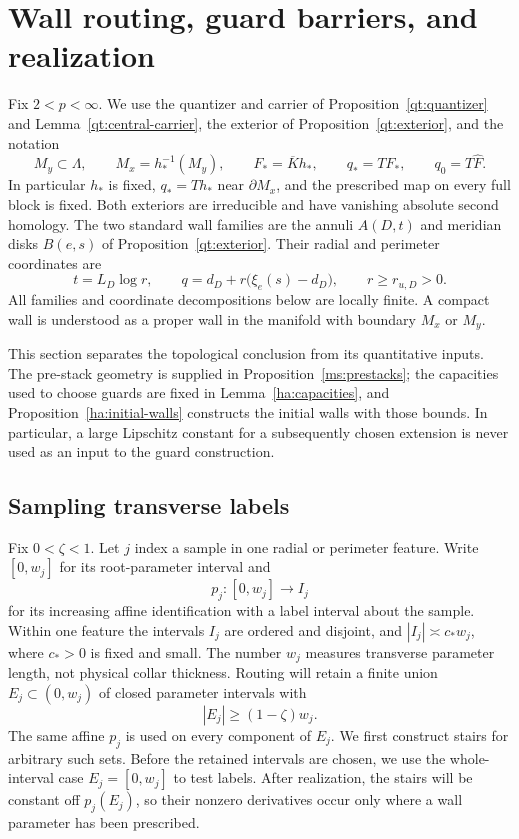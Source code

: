 \section{Wall routing, guard barriers, and realization}\label{sec:walls}\label{wl:section}

Fix $2<p<\infty$.  We use the quantizer and carrier of
Proposition~\ref{qt:quantizer} and Lemma~\ref{qt:central-carrier}, the exterior
of Proposition~\ref{qt:exterior}, and the notation
\[
 M_y\subset\Lambda,\qquad M_x=h_*^{-1}(M_y),\qquad
 F_*=\overline K h_*,\qquad q_*=TF_*,\qquad q_0=T\widehat F.
\]
In particular $h_*$ is fixed, $q_*=Th_*$ near $\partial M_x$, and the
prescribed map on every full block is fixed.  Both exteriors are
irreducible and have vanishing absolute second homology.  The two
standard wall families are the annuli $A(D,t)$ and meridian disks
$B(e,s)$ of Proposition~\ref{qt:exterior}.  Their radial and perimeter
coordinates are
\[
 t=L_D\log r,\qquad
 q=d_D+r\bigl(\xi_e(s)-d_D\bigr),\qquad r\geq r_{u,D}>0.
\]
All families and coordinate decompositions below are locally finite.
A compact wall is understood as a proper wall in the manifold with
boundary $M_x$ or $M_y$.

This section separates the topological conclusion from its quantitative
inputs.  The pre-stack geometry is supplied in
Proposition~\ref{ms:prestacks}; the capacities used to choose guards are
fixed in Lemma~\ref{ha:capacities}, and
Proposition~\ref{ha:initial-walls} constructs the initial walls with
those bounds.  In particular, a large
Lipschitz constant for a subsequently chosen extension is never used as
an input to the guard construction.

\subsection{Sampling transverse labels}

Fix $0<\zeta<1$.  Let $j$ index a sample in one radial or perimeter
feature.  Write
$[0,w_j]$ for its root-parameter interval and
\[
 p_j:[0,w_j]\longrightarrow I_j
\]
for its increasing affine identification with a label interval about
the sample.  Within one feature the intervals $I_j$ are ordered and
disjoint, and $|I_j|\asymp c_*w_j$, where $c_*>0$ is fixed and small.
The number $w_j$ measures transverse parameter length, not physical
collar thickness.  Routing will retain a finite union
$E_j\subset(0,w_j)$ of closed parameter intervals with
\begin{equation}\label{wl:occupied-length}
 |E_j|\geq(1-\zeta)w_j.
\end{equation}
The same affine $p_j$ is used on every component of $E_j$.
We first construct stairs for arbitrary such sets.  Before the retained
intervals are chosen, we use the whole-interval case $E_j=[0,w_j]$
to test labels.  After realization, the stairs will be constant off
$p_j(E_j)$, so their nonzero derivatives occur only where a wall
parameter has been prescribed.

